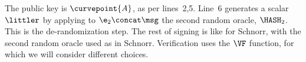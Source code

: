 The public key is $\curvepoint{A}$, as per lines~2,5. Line~6 generates a scalar $\littler$ by applying to $\e_2\concat \msg$ the second random oracle, $\HASH_2$. This is the de-randomization step. The rest of signing is like for Schnorr, with the second random oracle used as in Schnorr. Verification uses the $\VF$ function, for which we will consider different choices.

%
%
%
%
% 
%
%
%

